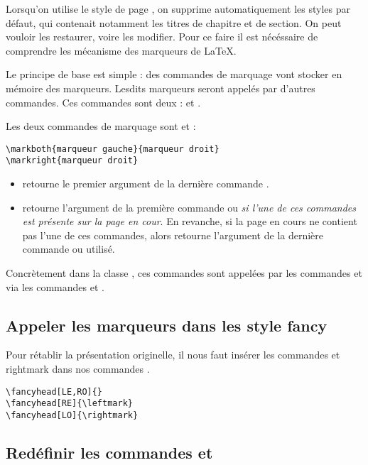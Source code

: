 Lorsqu'on utilise le style de page , on supprime automatiquement les styles par défaut, qui contenait notamment les titres de chapitre et de section. On peut vouloir les restaurer, voire les modifier. Pour ce faire il est nécéssaire de comprendre les mécanisme des marqueurs de \LaTeX. 

Le principe de base est simple : des commandes de marquage vont stocker en mémoire des marqueurs. Lesdits marqueurs seront appelés par d'autres commandes. Ces commandes sont  deux :  et .

Les deux commandes de marquage sont  et  :

\begin{verbatim}
\markboth{marqueur gauche}{marqueur droit}
\markright{marqueur droit}
\end{verbatim}

\begin{itemize}
\item {} retourne le premier argument de la dernière commande .
\item {} retourne l'argument  de la première commande  ou  \emph{si l'une de ces commandes est présente sur la page en cour}. En revanche, si la page en cours ne contient pas l'une de ces commandes, alors  retourne l'argument  de la dernière commande  ou  utilisé.
\end{itemize}

Concrètement dans la classe , ces commandes sont appelées par les commandes  et  via les commandes  et . 

\subsection{Appeler les marqueurs dans les style fancy}

Pour rétablir la présentation originelle, il nous faut insérer les commandes  et {rightmark} dans nos commandes .

\begin{verbatim}
\fancyhead[LE,RO]{}
\fancyhead[RE]{\leftmark}
\fancyhead[LO]{\rightmark}
\end{verbatim}

\subsection{Redéfinir les commandes  et }

